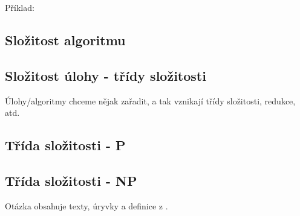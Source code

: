 Příklad:

\subsection*{Složitost algoritmu}

\subsection*{Složitost úlohy - třídy složitosti}
Úlohy/algoritmy chceme nějak zařadit, a tak vznikají třídy složitosti, redukce, atd.

\subsection*{Třída složitosti - P}

\subsection*{Třída složitosti - NP}

Otázka obsahuje texty, úryvky a definice z \cite{tal:demlova}.
